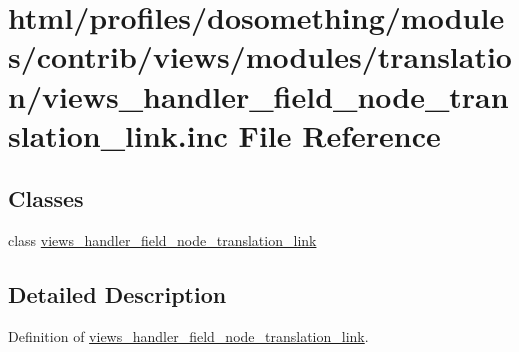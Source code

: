 \hypertarget{views__handler__field__node__translation__link_8inc}{
\section{html/profiles/dosomething/modules/contrib/views/modules/translation/views\_\-handler\_\-field\_\-node\_\-translation\_\-link.inc File Reference}
\label{views__handler__field__node__translation__link_8inc}
}
\subsection*{Classes}
\begin{DoxyCompactItemize}
\item 
class \hyperlink{classviews__handler__field__node__translation__link}{views\_\-handler\_\-field\_\-node\_\-translation\_\-link}
\end{DoxyCompactItemize}


\subsection{Detailed Description}
Definition of \hyperlink{classviews__handler__field__node__translation__link}{views\_\-handler\_\-field\_\-node\_\-translation\_\-link}. 